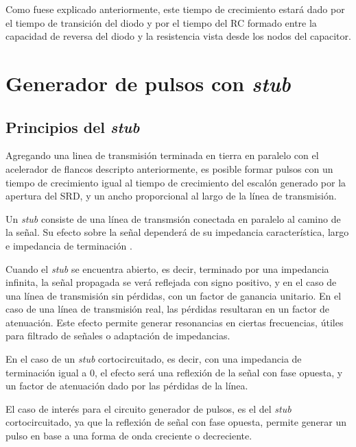 Como fuese explicado anteriormente, este
tiempo de crecimiento estará dado por el tiempo de transición del diodo y por el
tiempo del RC formado entre la capacidad de reversa del diodo y la resistencia
vista desde los nodos del capacitor.

\section{Generador de pulsos con \textit{stub}}
\label{sec:generador_pulsos_stub}

\subsection{Principios del \textit{stub}}

Agregando una linea de transmisión terminada en tierra en paralelo con el
acelerador de flancos descripto anteriormente, es posible formar pulsos con un
tiempo de crecimiento igual al tiempo de crecimiento del escalón generado por la
apertura del SRD, y un ancho proporcional al largo de la línea de transmisión.

Un \textit{stub} consiste de una línea de transmsión conectada en paralelo al
camino de la señal. Su efecto sobre la señal dependerá de su impedancia
característica, largo e impedancia de terminación \cite{pozar2011}.

Cuando el \textit{stub} se encuentra abierto, es decir, terminado por una
impedancia infinita, la señal propagada se verá reflejada con signo positivo, y
en el caso de una línea de transmisión sin pérdidas, con un factor de ganancia
unitario. En el caso de una línea de transmisión real, las pérdidas resultaran
en un factor de atenuación. Este efecto permite generar
resonancias en ciertas frecuencias, útiles para filtrado de señales o adaptación
de impedancias.

En el caso de un \textit{stub} cortocircuitado, es decir, con una impedancia de
terminación igual a $0$, el efecto será una reflexión de la señal con fase
opuesta, y un factor de atenuación dado por las pérdidas de la línea.

El caso de interés para el circuito generador de pulsos, es el del \textit{stub}
cortocircuitado, ya que la reflexión de señal con fase opuesta, permite generar
un pulso en base a una forma de onda creciente o decreciente.


